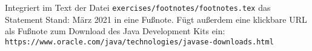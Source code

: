 Integriert im Text der Datei \texttt{exercises/footnotes/footnotes.tex} das Statement \glqq{}Stand: März 2021\grqq{} in eine Fußnote. Fügt außerdem eine klickbare URL als Fußnote zum Download des Java Development Kits ein:\\
\texttt{https://www.oracle.com/java/technologies/javase-downloads.html}

